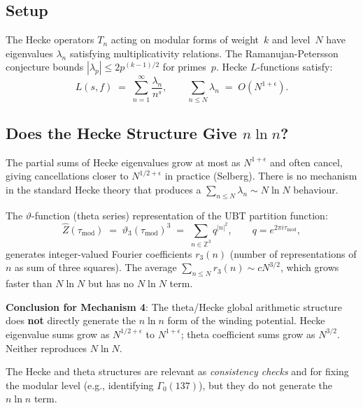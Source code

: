 \documentclass[12pt,a4paper]{article}
\theoremstyle{definition}
\theoremstyle{remark}
\newcommand{\ZZ}{\mathbb{Z}}
\begin{document}
\subsection{Setup}
\label{ssec:nlogn:hecke_setup}

The Hecke operators $T_n$ acting on modular forms of weight~$k$ and level~$N$
have eigenvalues $\lambda_n$ satisfying multiplicativity relations.  The
Ramanujan-Petersson conjecture bounds $|\lambda_p| \le 2p^{(k-1)/2}$ for
primes~$p$.  Hecke $L$-functions satisfy:
\begin{equation}
  L(s, f) \;=\; \sum_{n=1}^{\infty}\frac{\lambda_n}{n^s},
  \qquad
  \sum_{n\le N}\lambda_n \;=\; O(N^{1+\epsilon}).
  \label{eq:nlogn:hecke_L}
\end{equation}

\subsection{Does the Hecke Structure Give $n\ln n$?}
\label{ssec:nlogn:hecke_nlogn}

The partial sums of Hecke eigenvalues grow at most as $N^{1+\epsilon}$ and
often cancel, giving cancellations closer to $N^{1/2+\epsilon}$ in practice
(Selberg).  There is no mechanism in the standard Hecke theory that produces
a $\sum_{n\le N} \lambda_n \sim N\ln N$ behaviour.

The $\vartheta$-function (theta series) representation of the UBT partition
function:
\begin{equation}
  \hat{Z}(\tau_\mathrm{mod}) \;=\; \vartheta_3(\tau_\mathrm{mod})^3
  \;=\; \sum_{n\in\ZZ^3} q^{|n|^2}, \qquad q = e^{2\pi i\tau_\mathrm{mod}},
  \label{eq:nlogn:theta3}
\end{equation}
generates integer-valued Fourier coefficients $r_3(n)$ (number of
representations of $n$ as sum of three squares).  The average $\sum_{n\le N}
r_3(n) \sim cN^{3/2}$, which grows faster than $N\ln N$ but has no
$N\ln N$ term.

\begin{resultbox}
\textbf{Conclusion for Mechanism 4}: The theta/Hecke global arithmetic structure
does \textbf{not} directly generate the $n\ln n$ form of the winding potential.
Hecke eigenvalue sums grow as $N^{1/2 + \epsilon}$ to $N^{1+\epsilon}$; theta
coefficient sums grow as $N^{3/2}$.  Neither reproduces $N\ln N$.

The Hecke and theta structures are relevant as \emph{consistency checks} and
for fixing the modular level (e.g., identifying $\Gamma_0(137)$), but they do
not generate the $n\ln n$ term.
\end{resultbox}
\end{document}
